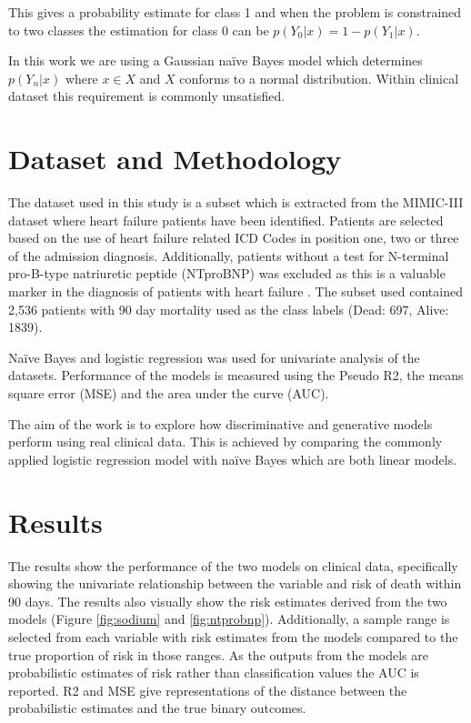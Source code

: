 \documentclass[a4paper,UKenglish]{oasics-v2016}
\begin{document}
This gives a probability estimate for class 1 and when the problem is constrained to two classes the estimation for class 0 can be $p(Y_0|x) = 1 - p(Y_1|x)$.

In this work we are using a Gaussian naïve Bayes model which determines $p(Y_n|x)$ where $x \in X$ and $X$ conforms to a normal distribution. Within clinical dataset this requirement is commonly unsatisfied.  

\section{Dataset and Methodology}
The dataset used in this study is a subset which is extracted from the MIMIC-III dataset \cite{Johnson2016} where heart failure patients have been identified. Patients are selected based on the use of heart failure related ICD Codes in position one, two or three of the admission diagnosis. Additionally, patients without a test for N-terminal pro-B-type natriuretic peptide (NTproBNP) was excluded as this is a valuable marker in the diagnosis of patients with heart failure \cite{NICE2010}. The subset used contained 2,536 patients with 90 day mortality used as the class labels (Dead: 697, Alive: 1839).

Naïve Bayes and logistic regression was used for univariate analysis of the datasets. Performance of the models is measured using the Pseudo R2, the means square error (MSE) and the area under the curve (AUC).

The aim of the work is to explore how discriminative and generative models perform using real clinical data. This is achieved by comparing the commonly applied logistic regression model with naïve Bayes which are both linear models.


\section{Results}



The results show the performance of the two models on clinical data, specifically showing the univariate relationship between the variable and risk of death within 90 days. The results also visually show the risk estimates derived from the two models (Figure \ref{fig:sodium} and \ref{fig:ntprobnp}).  Additionally, a sample range is selected from each variable with risk estimates from the models compared to the true proportion of risk in those ranges. As the outputs from the models are probabilistic estimates of risk rather than classification values the AUC is reported. R2 and MSE give representations of the distance between the probabilistic estimates and the true binary outcomes.
\end{document}
